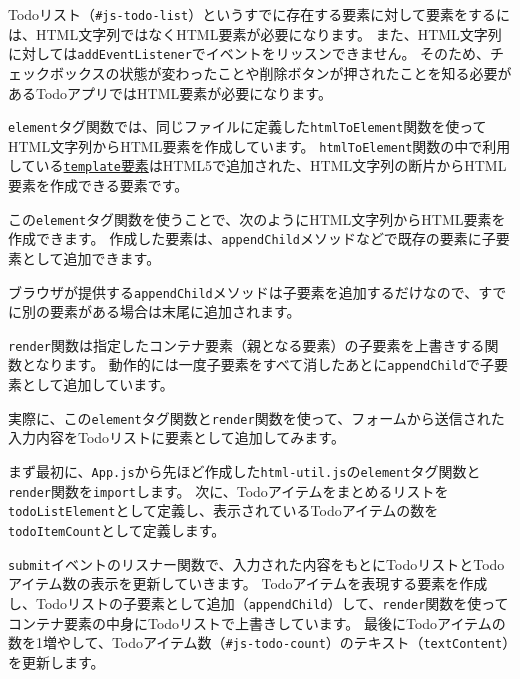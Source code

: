 Todoリスト（\texttt{\#js-todo-list}）というすでに存在する要素に対して要素を\textbf{}するには、HTML文字列ではなくHTML要素が必要になります。
また、HTML文字列に対しては\texttt{addEventListener}でイベントをリッスンできません。
そのため、チェックボックスの状態が変わったことや削除ボタンが押されたことを知る必要があるTodoアプリではHTML要素が必要になります。



\texttt{element}タグ関数では、同じファイルに定義した\texttt{htmlToElement}関数を使ってHTML文字列からHTML要素を作成しています。
\texttt{htmlToElement}関数の中で利用している\href{https://developer.mozilla.org/ja/docs/Web/HTML/Element/template}{\texttt{template}要素}はHTML5で追加された、HTML文字列の断片からHTML要素を作成できる要素です。

この\texttt{element}タグ関数を使うことで、次のようにHTML文字列からHTML要素を作成できます。
作成した要素は、\texttt{appendChild}メソッドなどで既存の要素に子要素として追加できます。



ブラウザが提供する\texttt{appendChild}メソッドは子要素を追加するだけなので、すでに別の要素がある場合は末尾に追加されます。

\texttt{render}関数は指定したコンテナ要素（親となる要素）の子要素を上書きする関数となります。
動作的には一度子要素をすべて消したあとに\texttt{appendChild}で子要素として追加しています。



実際に、この\texttt{element}タグ関数と\texttt{render}関数を使って、フォームから送信された入力内容をTodoリストに要素として追加してみます。

まず最初に、\texttt{App.js}から先ほど作成した\texttt{html-util.js}の\texttt{element}タグ関数と\texttt{render}関数を\texttt{import}します。
次に、Todoアイテムをまとめるリストを\texttt{todoListElement}として定義し、表示されているTodoアイテムの数を\texttt{todoItemCount}として定義します。

\texttt{submit}イベントのリスナー関数で、入力された内容をもとにTodoリストとTodoアイテム数の表示を更新していきます。
Todoアイテムを表現する要素を作成し、Todoリストの子要素として追加（\texttt{appendChild}）して、\texttt{render}関数を使ってコンテナ要素の中身にTodoリストで上書きしています。
最後にTodoアイテムの数を1増やして、Todoアイテム数（\texttt{\#js-todo-count}）のテキスト（\texttt{textContent}）を更新します。
\newpage


